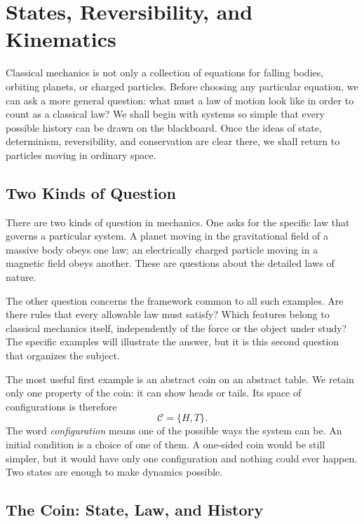 \chapter{States, Reversibility, and Kinematics}

Classical mechanics is not only a collection of equations for falling bodies,
orbiting planets, or charged particles.  Before choosing any particular
equation, we can ask a more general question: what must a law of motion look
like in order to count as a classical law?  We shall begin with systems so
simple that every possible history can be drawn on the blackboard.  Once the
ideas of state, determinism, reversibility, and conservation are clear there,
we shall return to particles moving in ordinary space.

\section{Two Kinds of Question}

There are two kinds of question in mechanics.  One asks for the specific law
that governs a particular system.  A planet moving in the gravitational field
of a massive body obeys one law; an electrically charged particle moving in a
magnetic field obeys another.  These are questions about the detailed laws of
nature.

The other question concerns the framework common to all such examples.  Are
there rules that every allowable law must satisfy?  Which features belong to
classical mechanics itself, independently of the force or the object under
study?  The specific examples will illustrate the answer, but it is this
second question that organizes the subject.

The most useful first example is an abstract coin on an abstract table.  We
retain only one property of the coin: it can show heads or tails.  Its space of
configurations is therefore
\begin{equation}
  \mathcal C=\{H,T\}.
\end{equation}
The word \emph{configuration} means one of the possible ways the system can
be.  An initial condition is a choice of one of them.  A one-sided coin would
be still simpler, but it would have only one configuration and nothing could
ever happen.  Two states are enough to make dynamics possible.

\section{The Coin: State, Law, and History}

